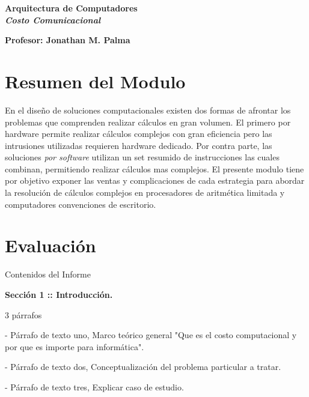 \documentclass[10pt,a4paper]{article}
\begin{document}
\vspace{6 mm}


\begin{center}
\textbf{{\LARGE   Arquitectura de Computadores\\ 
		\vspace{2 mm}	
			  {\em Costo Comunicacional}} } 
\end{center}
\vspace{3 mm}		
\textbf{Profesor: Jonathan M. Palma}~\\ %


	
	
\section{Resumen del Modulo}
En el diseño de soluciones computacionales existen dos formas de afrontar los problemas que comprenden realizar cálculos en gran volumen.    El primero {por hardware} permite realizar cálculos complejos con gran eficiencia  pero las intrusiones utilizadas requieren  hardware dedicado. 
Por contra parte, las soluciones {\em por software} utilizan un set resumido de instrucciones las cuales  combinan, permitiendo realizar cálculos mas complejos. 
 El presente modulo tiene por objetivo exponer las ventas y complicaciones de cada estrategia para   abordar la resolución de cálculos complejos en procesadores de aritmética limitada y computadores convenciones de escritorio. 
  

\section{Evaluación}


Contenidos del Informe 

\textbf{Sección 1 ::  Introducción.}

3 párrafos

- Párrafo de texto uno, Marco teórico general "Que es el costo computacional y por que es importe para informática".

- Párrafo de texto dos,  Conceptualización del problema particular a tratar.

- Párrafo de texto tres, Explicar  caso de estudio. 
\end{document}
